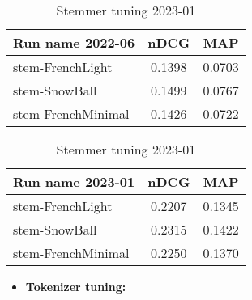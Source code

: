 \begin{table}[ht]
    \centering
    \begin{minipage}{0.48\textwidth}
        \centering
        \begin{tabular}{ |l|c|c| }
            \hline
            Run name 2022-06 & nDCG & MAP \\ [0.5ex]
            \hline\hline
            stem-FrenchLight & 0.1398 & 0.0703 \\
            \rowcolor{LightYellow}
            stem-SnowBall & 0.1499 & 0.0767 \\
            stem-FrenchMinimal & 0.1426 & 0.0722 \\
            \hline
        \end{tabular}
        \caption{Stemmer tuning 2022-06}
        \label{tab:stemmer-a}
    \end{minipage}
    \hfill
    \begin{minipage}{0.48\textwidth}
        \centering
        \begin{tabular}{ |l|c|c| }
            \hline
            Run name 2023-01 & nDCG & MAP \\ [0.5ex]
            \hline\hline
            stem-FrenchLight & 0.2207 & 0.1345 \\
            \rowcolor{LightYellow}
            stem-SnowBall & 0.2315 & 0.1422 \\
            stem-FrenchMinimal & 0.2250 & 0.1370 \\
            \hline
        \end{tabular}
        \caption{Stemmer tuning 2023-01}
        \label{tab:stemmer-b}
    \end{minipage}
\end{table}

\begin{itemize}
    \item  \textbf{Tokenizer tuning:}
\end{itemize}


